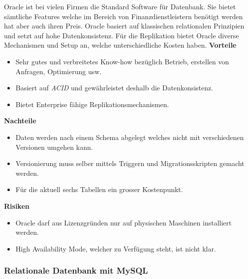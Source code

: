 Oracle ist bei vielen Firmen die Standard Software für Datenbank. Sie bietet sämtliche Features welche im Bereich von Finanzdienstleistern benötigt werden hat aber auch ihren Preis. Oracle basiert auf klassischen relationalen Prinzipien und setzt auf hohe Datenkonsistenz. Für die Replikation bietet Oracle diverse Mechanismen und Setup an, welche unterschiedliche Kosten haben.
\newline
\newline
\textbf{Vorteile}
\begin{itemize}
	\item Sehr gutes und verbreitetes Know-how bezüglich Betrieb, erstellen von Anfragen, Optimierung usw.
	\item Basiert auf \textit{\gls{ACID}} und gewährleistet deshalb die Datenkonsistenz.
	\item Bietet Enterprise fähige Replikationsmechanismen.
\end{itemize}
\textbf{Nachteile}
\begin{itemize}
	\item Daten werden nach einem Schema abgelegt welches nicht mit verschiedenen Versionen umgehen kann.
	\item Versionierung muss selber mittels Triggern und Migrationsskripten gemacht werden.	
	\item Für die aktuell sechs Tabellen ein grosser Kostenpunkt. 
\end{itemize}
\textbf{Risiken}
\begin{itemize}
	\item Oracle darf aus Lizenzgründen nur auf physischen Maschinen installiert werden.
	\item High Availability Mode, welcher zu Verfügung steht, ist nicht klar.
\end{itemize}

\subsubsection{Relationale Datenbank mit MySQL}

